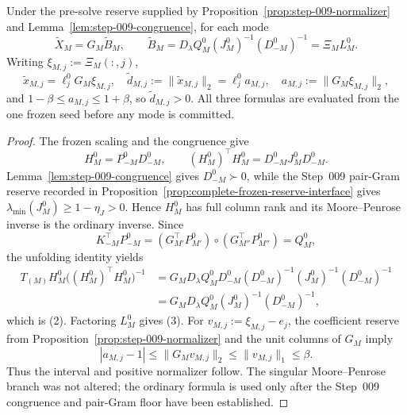 \begin{proposition}\label{prop:step-010-frozen-solves}
Under the pre-solve reserve supplied by Proposition~\ref{prop:step-009-normalizer}
and Lemma~\ref{lem:step-009-congruence}, for each mode
\[
\widetilde X_M=G_M\widetilde B_M,\qquad
\widetilde B_M=D_\lambda Q_M^0(J_M^0)^{-1}(D_{-M}^0)^{-1}
=\Xi_ML_M^0. \tag{2}
\]
Writing \(\xi_{M,j}:=\Xi_M(:,j)\),
\[
\widetilde x_{M,j}=\ell_j^0G_M\xi_{M,j},\quad
\widetilde d_{M,j}:=\|\widetilde x_{M,j}\|_2
=\ell_j^0a_{M,j},\quad a_{M,j}:=\|G_M\xi_{M,j}\|_2, \tag{3}
\]
and \(1-\beta\le a_{M,j}\le1+\beta\), so
\(\widetilde d_{M,j}>0\).  All three formulas are evaluated from the one
frozen seed before any mode is committed.

\begin{proof}
The frozen scaling and the congruence give
\[
H_M^0=P_{-M}^0D_{-M}^0,\qquad
(H_M^0)^\top H_M^0=D_{-M}^0J_M^0D_{-M}^0. \tag{4}
\]
Lemma~\ref{lem:step-009-congruence} gives $D_{-M}^0\succ0$, while the
Step~009 pair-Gram reserve recorded in
Proposition~\ref{prop:complete-frozen-reserve-interface} gives
$\lambda_{\min}(J_M^0)\ge1-\eta_J>0$. Hence $H_M^0$ has full column rank and
its Moore--Penrose inverse is the ordinary inverse. Since
\[
K_{-M}^{\top}P_{-M}^0
=(G_{M'}^\top P_{M'}^0)\circ(G_{M''}^\top P_{M''}^0)
=Q_M^0,
\]
the unfolding identity yields
\[
\begin{aligned}
T_{(M)}H_M^0\big((H_M^0)^\top H_M^0\big)^{-1}
&=G_MD_\lambda Q_M^0D_{-M}^0
 (D_{-M}^0)^{-1}(J_M^0)^{-1}(D_{-M}^0)^{-1}\\
&=G_MD_\lambda Q_M^0(J_M^0)^{-1}(D_{-M}^0)^{-1},
\end{aligned}
\]
which is (2).  Factoring \(L_M^0\) gives (3).  For
\(v_{M,j}:=\xi_{M,j}-e_j\), the coefficient reserve from
Proposition~\ref{prop:step-009-normalizer} and the unit columns of $G_M$ imply
\[
|a_{M,j}-1|\le\|G_Mv_{M,j}\|_2\le\|v_{M,j}\|_1\le\beta. \tag{5}
\]
Thus the interval and positive normalizer follow. The singular
Moore--Penrose branch was not altered; the ordinary formula is used only
after the Step~009 congruence and pair-Gram floor have been established.


\end{proof}
\end{proposition}
